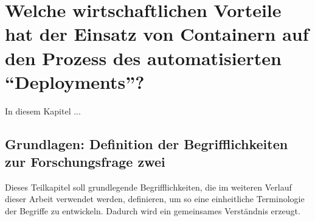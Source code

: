 \chapter[Forschungsfrage 2]{Welche wirtschaftlichen Vorteile hat der Einsatz von Containern auf den Prozess des automatisierten \enquote{Deployments}?} \label{ff2}
In diesem Kapitel ...

\section{Grundlagen: Definition der Begrifflichkeiten zur Forschungsfrage zwei}
Dieses Teilkapitel soll grundlegende Begrifflichkeiten, die im weiteren Verlauf dieser Arbeit verwendet werden, definieren, um so eine einheitliche Terminologie der Begriffe zu entwickeln. Dadurch wird ein gemeinsames Verständnis erzeugt.


